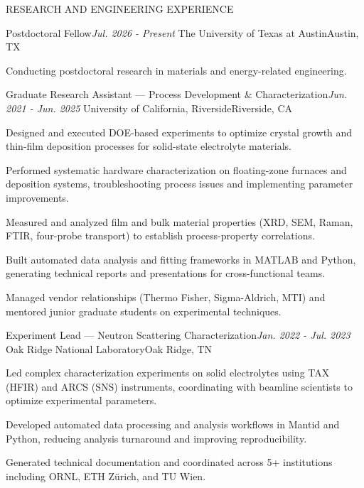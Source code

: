 \documentclass{resume}
\begin{document}
\begin{rSection}{RESEARCH AND ENGINEERING EXPERIENCE}

\begin{rSubsection}
    {Postdoctoral Fellow}{\em Jul. 2026 - Present}
    {The University of Texas at Austin}{Austin, TX}
\item Conducting postdoctoral research in materials and energy-related engineering.
\end{rSubsection}

\begin{rSubsection}
    {Graduate Research Assistant --- Process Development \& Characterization}{\em Jun. 2021 - Jun. 2025}
    {University of California, Riverside}{Riverside, CA}
\item Designed and executed DOE-based experiments to optimize crystal growth and thin-film deposition processes for solid-state electrolyte materials.
\item Performed systematic hardware characterization on floating-zone furnaces and deposition systems, troubleshooting process issues and implementing parameter improvements.
\item Measured and analyzed film and bulk material properties (XRD, SEM, Raman, FTIR, four-probe transport) to establish process-property correlations.
\item Built automated data analysis and fitting frameworks in MATLAB and Python, generating technical reports and presentations for cross-functional teams.
\item Managed vendor relationships (Thermo Fisher, Sigma-Aldrich, MTI) and mentored junior graduate students on experimental techniques.
\end{rSubsection}

\begin{rSubsection}
    {Experiment Lead --- Neutron Scattering Characterization}{\em Jan. 2022 - Jul. 2023}
    {Oak Ridge National Laboratory}{Oak Ridge, TN}
\item Led complex characterization experiments on solid electrolytes using TAX (HFIR) and ARCS (SNS) instruments, coordinating with beamline scientists to optimize experimental parameters.
\item Developed automated data processing and analysis workflows in Mantid and Python, reducing analysis turnaround and improving reproducibility.
\item Generated technical documentation and coordinated across 5+ institutions including ORNL, ETH Z\"{u}rich, and TU Wien.
\end{rSubsection}


\end{rSection}
\end{document}

